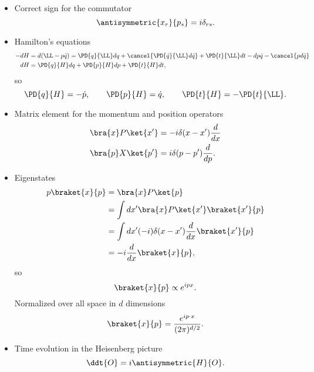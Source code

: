 \begin{itemize}
\item Correct sign for the commutator
\begin{dmath}\label{eqn:usefulFormulas:80}
\antisymmetric{x_r}{p_s} = i \delta_{rs}.
\end{dmath}
\item Hamilton's equations
\begin{dmath}\label{eqn:usefulFormulas:100}
\begin{aligned}
-dH &= d(\LL - p \dot{q}) = \PD{q}{\LL} dq + \cancel{\PD{\dot{q}}{\LL} d\dot{q}} + \PD{t}{\LL} dt - dp \dot{q} - \cancel{p d\dot{q}} \\
dH &=
\PD{q}{H} dq
+
\PD{p}{H} dp
+
\PD{t}{H} dt,
\end{aligned}
\end{dmath}
so
\begin{equation}\label{eqn:usefulFormulas:120}
\PD{q}{H} = -\dot{p},\qquad
\PD{p}{H} = \dot{q},\qquad
\PD{t}{H} = -\PD{t}{\LL}.
\end{equation}
\item Matrix element for the momentum and position operators
\begin{dmath}\label{eqn:usefulFormulas:140}
\begin{aligned}
\bra{x} P \ket{x'} &= -i \delta(x- x') \frac{d}{dx} \\
\bra{p} X \ket{p'} &= i \delta(p- p') \frac{d}{dp}.
\end{aligned}
\end{dmath}
\item Eigenstates
\begin{dmath}\label{eqn:usefulFormulas:160}
\begin{aligned}
p \braket{x}{p}
&= \bra{x} P \ket{p} \\
&= \int dx' \bra{x} P \ket{x'} \braket{x'}{p} \\
&= \int dx' (-i) \delta(x - x') \frac{d}{dx} \braket{x'}{p} \\
&= -i \frac{d}{dx} \braket{x}{p},
\end{aligned}
\end{dmath}
so
\begin{dmath}\label{eqn:usefulFormulas:180}
\braket{x}{p} \propto e^{i p x}.
\end{dmath}
Normalized over all space in \( d \) dimensions
\begin{dmath}\label{eqn:usefulFormulas:200}
\braket{x}{p} = \frac{e^{i p \cdot x}}{(2 \pi)^{d/2}}.
\end{dmath}
\item Time evolution in the Heisenberg picture
\begin{dmath}\label{eqn:usefulFormulas:220}
\ddt{O} = i \antisymmetric{H}{O}.
\end{dmath}

\end{itemize}
